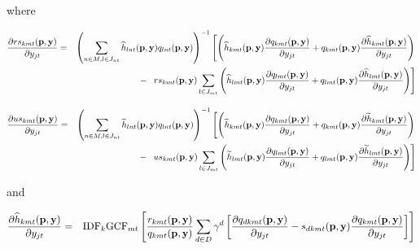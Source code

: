 \documentclass[12pt]{article}
\begin{document}
\noindent where

\begin{footnotesize}
		\setlength{\arraycolsep}{1.5pt}
		
		\begin{eqnarray*}
			\frac{ \partial rs_{kmt}({\bf p},{\bf y})}{\partial y_{jt}} &=& \left(\sum_{n\in M,l \in J_{nt}} \widehat{h}_{lnt}({\bf p},{\bf y}) q_{lnt}({\bf p},{\bf y})\right)^{-1}\left[\left(\widehat{h}_{kmt}({\bf p},{\bf y})\frac{\partial q_{kmt}({\bf p},{\bf y})}{\partial y_{jt}} + q_{kmt}({\bf p},{\bf y})\frac{\partial \widehat{h}_{kmt}({\bf p},{\bf y})}{\partial y_{jt}} \right) \right.\\
			&& - \,\,\, \left. rs_{kmt}({\bf p},{\bf y}) \sum_{l \in J_{mt}}  \left(\widehat{h}_{lmt}({\bf p},{\bf y})\frac{\partial q_{lmt}({\bf p},{\bf y})}{\partial y_{jt}} + q_{lmt}({\bf p},{\bf y})\frac{\partial \widehat{h}_{lmt}({\bf p},{\bf y})}{\partial y_{jt}} \right)\right] 
		\end{eqnarray*}	
		
	\end{footnotesize}
	
	
	\begin{footnotesize}
		\setlength{\arraycolsep}{1.5pt}
		
		\begin{eqnarray*}
			\frac{ \partial us_{kmt}({\bf p},{\bf y})}{\partial y_{jt}} &=& \left(\sum_{n\in M,l \in J_{nt}} \widetilde{h}_{lnt}({\bf p},{\bf y}) q_{lnt}({\bf p},{\bf y})\right)^{-1}\left[\left(\widetilde{h}_{kmt}({\bf p},{\bf y})\frac{\partial q_{kmt}({\bf p},{\bf y})}{\partial y_{jt}} + q_{kmt}({\bf p},{\bf y})\frac{\partial \widetilde{h}_{kmt}({\bf p},{\bf y})}{\partial y_{jt}} \right) \right.\\
			&& - \,\,\, \left. us_{kmt}({\bf p},{\bf y}) \sum_{l \in J_{mt}}  \left(\widetilde{h}_{lmt}({\bf p},{\bf y})\frac{\partial q_{lmt}({\bf p},{\bf y})}{\partial y_{jt}} + q_{lmt}({\bf p},{\bf y})\frac{\partial\widetilde{h}_{lmt}({\bf p},{\bf y})}{\partial y_{jt}} \right)\right] 
		\end{eqnarray*}	
		
	\end{footnotesize}

\noindent and

\begin{eqnarray*}
		\frac{\partial \widehat{h}_{kmt}({\bf p},{\bf y})}{\partial y_{jt}} &=& \mathrm{IDF}_k\mathrm{GCF}_{mt} \left[\frac{r_{kmt}({\bf p},{\bf y})}{q_{kmt}({\bf p},{\bf y})} \sum_{d \in D} \gamma^d \left[\frac{\partial q_{dkmt}({\bf p},{\bf y})}{\partial y_{jt}} - s_{dkmt}({\bf p},{\bf y}) \frac{\partial q_{kmt}({\bf p},{\bf y})}{\partial y_{jt}} \right] \right]
	\end{eqnarray*}
	
\end{document}

